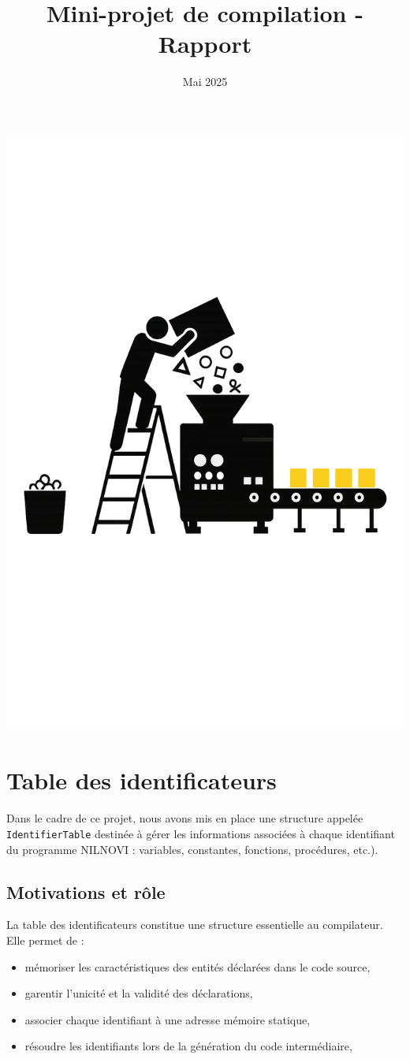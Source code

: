 \documentclass[a4paper, 12pt]{article}
\title{Mini-projet de compilation - Rapport}
\author{
    \Names
}
\date{Mai 2025}
\begin{document}
    \maketitle

    \begin{center}
        \includegraphics[width=0.5\linewidth]{pics/illustration.png}
    \end{center}

    \newpage

    \tableofcontents
    \lstlistoflistings

    \newpage

    \section{Table des identificateurs}

    Dans le cadre de ce projet, nous avons mis en place une structure appelée \texttt{IdentifierTable} destinée à gérer les informations associées à chaque identifiant du programme NILNOVI : variables, constantes, fonctions, procédures, etc.).

    \subsection{Motivations et rôle}
    La table des identificateurs constitue une structure essentielle au compilateur. Elle permet de : 
    \begin{itemize}
        \item mémoriser les caractéristiques des entités déclarées dans le code source, 
        \item garentir l'unicité et la validité des déclarations,
        \item associer chaque identifiant à une adresse mémoire statique, 
        \item résoudre les identifiants lors de la génération du code intermédiaire,
    \end{itemize}
\end{document}
